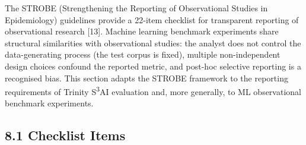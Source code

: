 The STROBE (Strengthening the Reporting of
Observational Studies in Epidemiology) guidelines
provide a 22-item checklist for transparent
reporting of observational research [13].  Machine
learning benchmark experiments share structural
similarities with observational studies: the
analyst does not control the data-generating
process (the test corpus is fixed), multiple
non-independent design choices confound the
reported metric, and post-hoc selective reporting
is a recognised bias.  This section adapts the
STROBE framework to the reporting requirements of
Trinity S\textsuperscript{3}AI evaluation and, more
generally, to ML observational benchmark
experiments.

\subsection{8.1 Checklist
Items}\label{fa_14:checklist-items}

